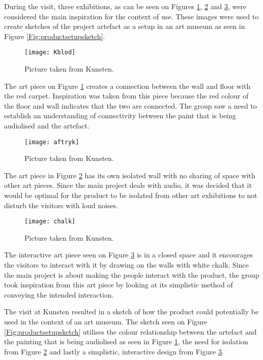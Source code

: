 During the visit, three exhibitions, as can be seen on Figures \ref{Fig:Kblod}, \ref{Fig:aftryk} and \ref{Fig:chalk}, were considered the main inspiration for the context of use. These images were used to create sketches of the project artefact as a setup in an art museum as seen in Figure \ref{Fig:productsetupsketch}.

\begin{figure}[!h]
\centering
\texttt{[image: Kblod]}
\caption{\label{Fig:Kblod} Picture taken from Kunsten.}
\end{figure}
The art piece on Figure \ref{Fig:Kblod} creates a connection between the wall and floor with the red carpet. Inspiration was taken from this piece because the red colour of the floor and wall indicates that the two are connected. The group saw a need to establish an understanding of connectivity between the paint that is being audiolised and the artefact.

\begin{figure}[!h]
\centering
\texttt{[image: aftryk]}
\caption{\label{Fig:aftryk} Picture taken from Kunsten.}
\end{figure}

The art piece in Figure \ref{Fig:aftryk} has its own isolated wall with no sharing of space with other art pieces. Since the main project deals with audio, it was decided that it would be optimal for the product to be isolated from other art exhibitions to not disturb the visitors with loud noises.

\begin{figure}[!h]
\centering
\texttt{[image: chalk]}
\caption{\label{Fig:chalk} Picture taken from Kunsten.}
\end{figure}

The interactive art piece seen on Figure \ref{Fig:chalk} is in a closed space and it encourages the visitors to interact with it by drawing on the walls with white chalk. Since the main project is about making the people interact with the product, the group took inspiration from this art piece by looking at its simplistic method of conveying the intended interaction.

The visit at Kunsten resulted in a sketch of how the product could potentially be used in the context of an art museum. The sketch seen on Figure \ref{Fig:productsetupsketch} utilises the colour relationship between the artefact and the painting that is being audiolised as seen in Figure \ref{Fig:Kblod}, the need for isolation from Figure \ref{Fig:aftryk} and lastly a simplistic, interactive design from Figure \ref{Fig:chalk}.

